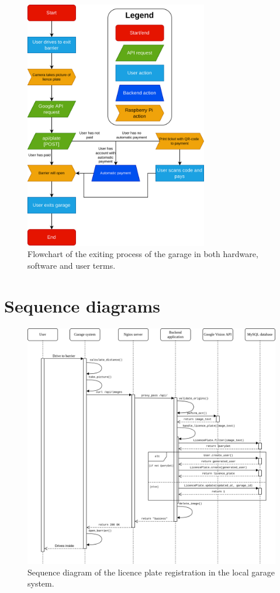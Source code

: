 \begin{appendices}
\begin{figure}[htp]
    \centering
    \includegraphics[width=8cm]{images/garage_exit.drawio.png}
    \caption{Flowchart of the exiting process of the garage in both hardware, software and user terms.}
    \label{fig:garage-exit}
\end{figure}

\section{Sequence diagrams}\label{app:sequence-diagrams}
\begin{figure}
    \centering
    \includegraphics[width=16cm]{images/sequence_diagram_licence_plate.drawio.png}
    \caption{Sequence diagram of the licence plate registration in the local garage system.}
    \label{fig:sequence-diagram-licence-plate}
\end{figure}


\end{appendices}
